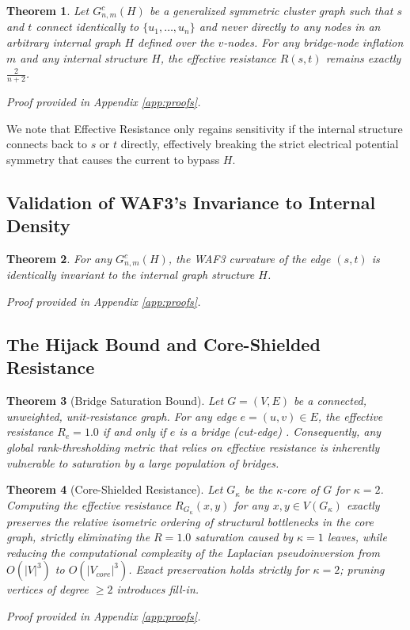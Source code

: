\documentclass[10pt]{article} %
\newtheorem{theorem}{Theorem}
\begin{document}
\begin{theorem}
Let $G^c_{n,m}(H)$ be a generalized symmetric cluster graph such that $s$ and $t$ connect identically to $\{u_1, \dots, u_n\}$ and never directly to any nodes in an arbitrary internal graph $H$ defined over the $v$-nodes. For any bridge-node inflation $m$ and any internal structure $H$, the effective resistance $R(s,t)$ remains exactly $\frac{2}{n+2}$.
\end{theorem}
\textit{Proof provided in Appendix \ref{app:proofs}.}

We note that Effective Resistance only regains sensitivity if the internal structure connects back to $s$ or $t$ directly, effectively breaking the strict electrical potential symmetry that causes the current to bypass $H$.

\subsection{Validation of WAF3's Invariance to Internal Density}
\begin{theorem}
For any $G^c_{n,m}(H)$, the WAF3 curvature of the edge $(s,t)$ is identically invariant to the internal graph structure $H$.
\end{theorem}
\textit{Proof provided in Appendix \ref{app:proofs}.}

\subsection{The Hijack Bound and Core-Shielded Resistance}
\begin{theorem}[Bridge Saturation Bound]
Let $G = (V, E)$ be a connected, unweighted, unit-resistance graph. For any edge $e=(u,v) \in E$, the effective resistance $R_e = 1.0$ if and only if $e$ is a bridge (cut-edge) \citep{Doyle1984}. Consequently, any global rank-thresholding metric that relies on effective resistance is inherently vulnerable to saturation by a large population of bridges.
\end{theorem}

\begin{theorem}[Core-Shielded Resistance]
Let $G_\kappa$ be the $\kappa$-core of $G$ for $\kappa = 2$. Computing the effective resistance $R_{G_\kappa}(x,y)$ for any $x,y \in V(G_\kappa)$ exactly preserves the relative isometric ordering of structural bottlenecks in the core graph, strictly eliminating the $R=1.0$ saturation caused by $\kappa=1$ leaves, while reducing the computational complexity of the Laplacian pseudoinversion from $O(|V|^3)$ to $O(|V_{core}|^3)$. Exact preservation holds strictly for $\kappa=2$; pruning vertices of degree $\ge 2$ introduces fill-in.
\end{theorem}
\textit{Proof provided in Appendix \ref{app:proofs}.}
\end{document}
